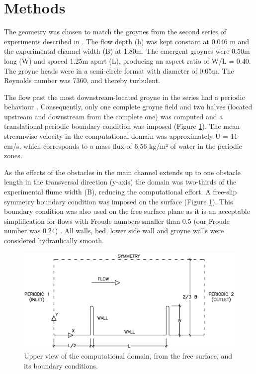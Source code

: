 \section{Methods}
The geometry was chosen to match the groynes from the second series of experiments described in \textcite{weitbrecht2004}. The flow depth (h) was kept constant at 0.046 m and the experimental channel width (B) at 1.80m. The emergent groynes were 0.50m long (W) and spaced 1.25m apart (L), producing an aspect ratio of W/L = 0.40. The groyne heads were in a semi-circle format with diameter of 0.05m. The Reynolds number was 7360, and thereby turbulent.

The flow past the most downstream-located groyne in the series had a periodic behaviour \cite{Hinterberger2007}. Consequently, only one complete groyne field and two halves (located upstream and downstream from the complete one) was computed and a translational periodic boundary condition was imposed (Figure \ref{fig:art1:numericalDomainArticle1}). The mean streamwise velocity in the computational domain was approximately U = 11 cm/s, which corresponds to a mass flux of 6.56 kg/m² of water in the periodic zones. 

As the effects of the obstacles in the main channel extends up to one obstacle length in the transversal direction (y-axis) \cite{Brevis2014} the domain was two-thirds of the experimental flume width (B), reducing the computational effort. A free-slip symmetry boundary condition was imposed on the surface (Figure \ref{fig:art1:numericalDomainArticle1}). This boundary condition was also used on the free surface plane as it is an acceptable simplification for flows with Froude numbers smaller than 0.5 (our Froude number was 0.24) \cite{alfrink1983}. All walls, bed, lower side wall and groyne walls were considered hydraulically smooth.

\begin{figure}[!ht]
\centering
\includegraphics[width=\linewidth]{../images/art1/imgMassExchange1.png}
\caption{Upper view of the computational domain, from the free surface, and its boundary conditions.}
\label{fig:art1:numericalDomainArticle1}
\end{figure}

